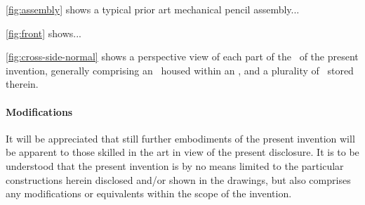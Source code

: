 
\pa
\mbox{\ref{fig:assembly}} shows a typical prior art mechanical pencil assembly...

\pa
\mbox{\ref{fig:front}} shows...

\pa
\mbox{\ref{fig:cross-side-normal}} shows a perspective view of each part of the \pencil\ of the present invention, generally comprising an \eraser\ housed within an \erasercup, and a plurality of \pencilleads\ stored therein.

\paragraph{Modifications}
It will be appreciated that still further embodiments of the present invention will be apparent
to those skilled in the art in view of the present disclosure.  It is to be understood that the
present invention is by no means limited to the particular constructions herein disclosed and/or
shown in the drawings, but also comprises any modifications or equivalents within the scope of the
invention.


